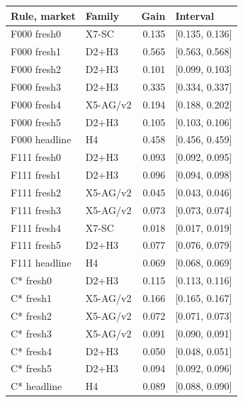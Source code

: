 \begin{tabular}{@{}llrl@{}}\toprule
Rule, market & Family & Gain & Interval \\\midrule
F000 fresh0 & X7-SC & 0.135 & [0.135, 0.136] \\
F000 fresh1 & D2+H3 & 0.565 & [0.563, 0.568] \\
F000 fresh2 & D2+H3 & 0.101 & [0.099, 0.103] \\
F000 fresh3 & D2+H3 & 0.335 & [0.334, 0.337] \\
F000 fresh4 & X5-AG/v2 & 0.194 & [0.188, 0.202] \\
F000 fresh5 & D2+H3 & 0.105 & [0.103, 0.106] \\
F000 headline & H4 & 0.458 & [0.456, 0.459] \\
F111 fresh0 & D2+H3 & 0.093 & [0.092, 0.095] \\
F111 fresh1 & D2+H3 & 0.096 & [0.094, 0.098] \\
F111 fresh2 & X5-AG/v2 & 0.045 & [0.043, 0.046] \\
F111 fresh3 & X5-AG/v2 & 0.073 & [0.073, 0.074] \\
F111 fresh4 & X7-SC & 0.018 & [0.017, 0.019] \\
F111 fresh5 & D2+H3 & 0.077 & [0.076, 0.079] \\
F111 headline & H4 & 0.069 & [0.068, 0.069] \\
C* fresh0 & D2+H3 & 0.115 & [0.113, 0.116] \\
C* fresh1 & X5-AG/v2 & 0.166 & [0.165, 0.167] \\
C* fresh2 & X5-AG/v2 & 0.072 & [0.071, 0.073] \\
C* fresh3 & X5-AG/v2 & 0.091 & [0.090, 0.091] \\
C* fresh4 & D2+H3 & 0.050 & [0.048, 0.051] \\
C* fresh5 & D2+H3 & 0.094 & [0.092, 0.096] \\
C* headline & H4 & 0.089 & [0.088, 0.090] \\
\bottomrule\end{tabular}
